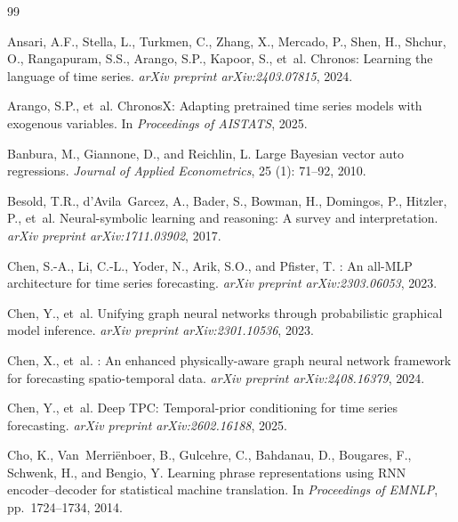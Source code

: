 \begin{thebibliography}{99}

Ansari, A.F., Stella, L., Turkmen, C., Zhang, X., Mercado, P., Shen, H., Shchur, O., Rangapuram, S.S., Arango, S.P., Kapoor, S., et~al.
\newblock Chronos: Learning the language of time series.
\newblock \emph{arXiv preprint arXiv:2403.07815}, 2024.

Arango, S.P., et~al.
\newblock ChronosX: Adapting pretrained time series models with exogenous variables.
\newblock In \emph{Proceedings of AISTATS}, 2025.

Banbura, M., Giannone, D., and Reichlin, L.
\newblock Large {B}ayesian vector auto regressions.
\newblock \emph{Journal of Applied Econometrics}, 25 (1): 71--92, 2010.

Besold, T.R., d'Avila~Garcez, A., Bader, S., Bowman, H., Domingos, P., Hitzler, P., et~al.
\newblock Neural-symbolic learning and reasoning: A survey and interpretation.
\newblock \emph{arXiv preprint arXiv:1711.03902}, 2017.

Chen, S.-A., Li, C.-L., Yoder, N., Arik, S.O., and Pfister, T.
: An all-{MLP} architecture for time series forecasting.
\newblock \emph{arXiv preprint arXiv:2303.06053}, 2023.

Chen, Y., et~al.
\newblock Unifying graph neural networks through probabilistic graphical model inference.
\newblock \emph{arXiv preprint arXiv:2301.10536}, 2023.

Chen, X., et~al.
: An enhanced physically-aware graph neural network framework for forecasting spatio-temporal data.
\newblock \emph{arXiv preprint arXiv:2408.16379}, 2024.

Chen, Y., et~al.
\newblock Deep {TPC}: Temporal-prior conditioning for time series forecasting.
\newblock \emph{arXiv preprint arXiv:2602.16188}, 2025.

Cho, K., Van~Merri{\"e}nboer, B., Gulcehre, C., Bahdanau, D., Bougares, F., Schwenk, H., and Bengio, Y.
\newblock Learning phrase representations using {RNN} encoder--decoder for statistical machine translation.
\newblock In \emph{Proceedings of EMNLP}, pp.\ 1724--1734, 2014.


\end{thebibliography}
